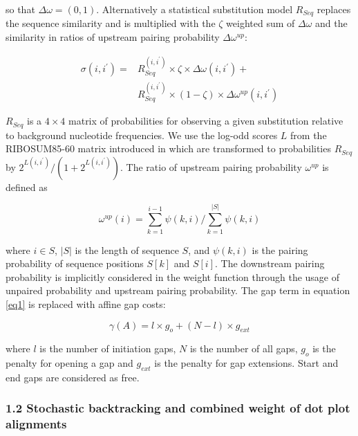 \documentclass[a4paper,11pt]{article}
\begin{document}
\noindent so that $\Delta \omega = (0,1)$. Alternatively a statistical substitution model
$R_{Seq}$ replaces the sequence similarity and is multiplied with the $\zeta$
weighted sum of $\Delta \omega$ and the similarity in ratios of upstream
pairing probability $\Delta \omega^{up}$:

\begin{equation}\label{sigmar}
\begin{aligned}
	\sigma(i,i^\prime) ={} & R_{Seq}^{(i,i^\prime)} \times \zeta \times \Delta \omega(i,i^\prime) +  \\
			       & R_{Seq}^{(i,i^\prime)} \times (1-\zeta) \times
	\Delta \omega^{up}(i,i^\prime)
\end{aligned}
\end{equation}

\noindent  $R_{Seq}$ is a $4\times4$ matrix of probabilities for observing
a given substitution relative to background nucleotide frequencies. We use the
log-odd scores $L$ from the RIBOSUM85-60 matrix introduced in
\cite{Klein14499004} which are transformed to probabilities $R_{Seq}$ by
$2^{L(i,i^\prime)} / (1 + 2^{L(i,i^\prime)})$. The ratio of upstream pairing probability
$\omega^{up}$ is defined as

\begin{equation}\label{eq5}
	\omega^{up}(i) = \sum_{k=1}^{i-1} \psi(k,i) /
	\sum_{k=1}^{|S|} \psi(k,i)
\end{equation}

\noindent where $i \in S$, $|S|$ is the length of sequence $S$, and $\psi(k,i)$ is the
pairing probability of sequence positions $S[k]$ and $S[i]$. The downstream
pairing probability is implicitly considered in the weight function through the
usage of unpaired probability and upstream pairing probability. The gap term
in equation \ref{eq1} is replaced with affine gap costs:

\begin{equation}\label{eq6}
	\gamma(A) = l \times g_o + (N-l) \times g_{ext}
\end{equation}
	
\noindent where $l$ is the number of initiation gaps, $N$ is the number of all gaps,
$g_o$ is the penalty for opening a gap and $g_{ext}$ is the penalty for gap
extensions. Start and end gaps are considered as free.\\

\subsubsection*{1.2 Stochastic backtracking and combined weight of dot plot alignments}
\end{document}
